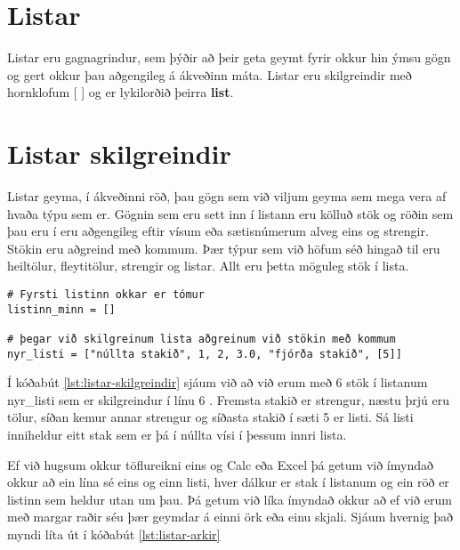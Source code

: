 
\chapter{Listar}\label{k:listar}
Listar eru gagnagrindur, sem þýðir að þeir geta geymt fyrir okkur hin ýmsu gögn og gert okkur þau aðgengileg á ákveðinn máta.
Listar eru skilgreindir með hornklofum [ ] og er lykilorðið þeirra \textbf{list}.

\chapter{Listar skilgreindir}\label{uk:listar-skilgreindir}
Listar geyma, í ákveðinni röð, þau gögn sem við viljum geyma sem mega vera af hvaða týpu sem er.
Gögnin sem eru sett inn í listann eru kölluð stök og röðin sem þau eru í eru aðgengileg eftir vísum eða sætisnúmerum alveg eins og strengir.
Stökin eru aðgreind með kommum.
Þær týpur sem við höfum séð hingað til eru heiltölur, fleytitölur, strengir og listar.
Allt eru þetta möguleg stök í lista.

\begin{lstlisting}[caption=Listar skilgreindir, label=lst:listar-skilgreindir]
# Fyrsti listinn okkar er tómur
listinn_minn = []

# þegar við skilgreinum lista aðgreinum við stökin með kommum
nyr_listi = ["núllta stakið", 1, 2, 3.0, "fjórða stakið", [5]]
\end{lstlisting}

Í kóðabút \ref{lst:listar-skilgreindir} sjáum við að við erum með 6 stök í listanum nyr\_listi sem er skilgreindur í línu 6 .
Fremsta stakið er strengur, næstu þrjú eru tölur, síðan kemur annar strengur og síðasta stakið í sæti 5 er listi.
Sá listi inniheldur eitt stak sem er þá í núllta vísi í þessum innri lista.

Ef við hugsum okkur töflureikni eins og Calc eða Excel þá getum við ímyndað okkur að ein lína sé eins og einn listi, hver dálkur er stak í listanum og ein röð er listinn sem heldur utan um þau.
Þá getum við líka ímyndað okkur að ef við erum með margar raðir séu þær geymdar á einni örk eða einu skjali.
Sjáum hvernig það myndi líta út í kóðabút \ref{lst:listar-arkir}

